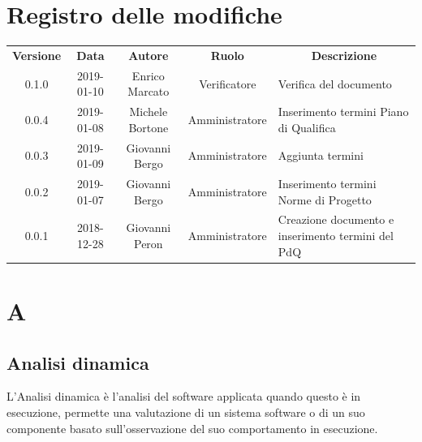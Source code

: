\renewcommand {\footrulewidth}{0.2mm}

\usepackage{lipsum}

	
	\newpage
	\section*{\centering Registro delle modifiche}
	\begin{tabularx}{\textwidth}{ c | c | c | c | X }
		\rowcolor{LightBlue}
		\color{white}\bfseries Versione & \color{white}\bfseries Data & \color{white}\bfseries Autore & \color{white}\bfseries Ruolo & \multicolumn{1}{c}{\color{white}\bfseries Descrizione}\\[0.25cm]
		0.1.0 & 2019-01-10 & Enrico Marcato & Verificatore & Verifica del documento \\ 
		\hline
		0.0.4 & 2019-01-08 & Michele Bortone & Amministratore & Inserimento termini Piano di Qualifica \\ 
		\hline 
		0.0.3 & 2019-01-09 & Giovanni Bergo & Amministratore & Aggiunta termini \\ 
		\hline 
		0.0.2 & 2019-01-07 & Giovanni Bergo & Amministratore & Inserimento termini Norme di Progetto \\ 
		\hline 
		0.0.1 & 2018-12-28 & Giovanni Peron & Amministratore & Creazione documento e \newline inserimento termini del PdQ \\ 
		\hline
	
	\end{tabularx}
	\newpage
	\setcounter{secnumdepth}{0}
	
	
	\printindex
	\newpage
	\section{A}

	\subsection{Analisi dinamica} 
		L'Analisi dinamica è l'analisi del software applicata quando questo è in esecuzione, permette una valutazione di un sistema software o di un suo componente basato sull’osservazione del suo comportamento in esecuzione.
	
